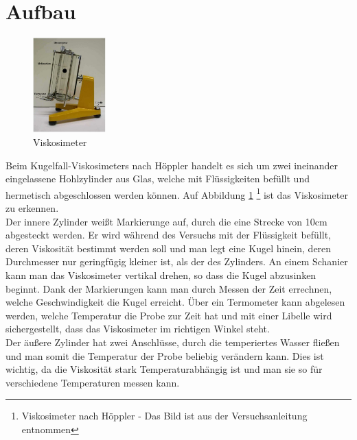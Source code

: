 	\section{Aufbau}
\begin{figure}
	\includegraphics[width=0.25\textwidth]{pics/aufbau.jpg}
	\caption{Viskosimeter}
	\label{aufbau}
\end{figure}

Beim Kugelfall-Viskosimeters nach Höppler handelt es sich um zwei ineinander eingelassene Hohlzylinder aus Glas, welche mit Flüssigkeiten befüllt und hermetisch abgeschlossen werden können. Auf Abbildung \ref{aufbau} \footnote{Viskosimeter nach Höppler - Das Bild ist aus der Versuchsanleitung entnommen} ist das Viskosimeter zu erkennen.\\
Der innere Zylinder weißt Markierunge auf, durch die eine Strecke von 10cm abgesteckt werden. Er wird während des Versuchs mit der Flüssigkeit befüllt, deren Viskosität bestimmt werden soll und man legt eine Kugel hinein, deren Durchmesser nur geringfügig kleiner ist, als der des Zylinders. An einem Schanier kann man das Viskosimeter vertikal drehen, so dass die Kugel abzusinken beginnt. Dank der Markierungen kann man durch Messen der Zeit errechnen, welche Geschwindigkeit die Kugel erreicht.
Über ein Termometer kann abgelesen werden, welche Temperatur die Probe zur Zeit hat und mit einer Libelle wird sichergestellt, dass das Viskosimeter im richtigen Winkel steht.\\
Der äußere Zylinder hat zwei Anschlüsse, durch die temperiertes Wasser fließen und man somit die Temperatur der Probe beliebig verändern kann. Dies ist wichtig, da die Viskosität stark Temperaturabhängig ist und man sie so für verschiedene Temperaturen messen kann. 

